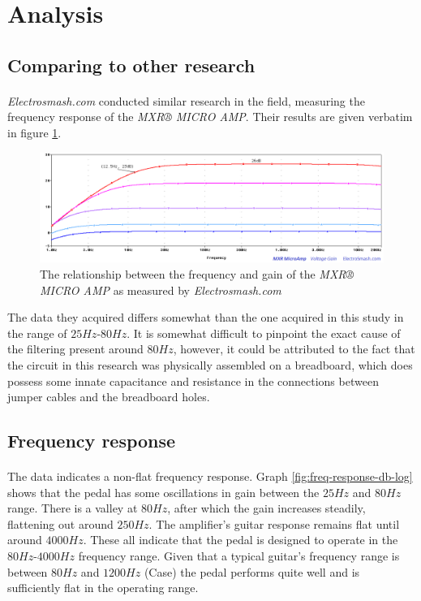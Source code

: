 \documentclass[a4paper, 12pt]{article}
\begin{document}
\section{Analysis}

\subsection{Comparing to other research}
\paragraph*{}
\textit{Electrosmash.com} conducted similar research in the field, measuring 
the frequency response of the \textit{MXR® MICRO AMP}. Their results are given 
verbatim in figure \ref{fig:freq-response-db-log-electrosmash}.
\begin{figure}[ht]
	\centering
	\includegraphics[width=\textwidth]{img/freq-response-db-log-electrosmash}
	\caption{The relationship between the frequency and gain of the 
	\textit{MXR® MICRO AMP} as measured by \textit{Electrosmash.com}}
	\label{fig:freq-response-db-log-electrosmash}
\end{figure}
The data they acquired differs somewhat than the one acquired in this study 
in the range of $25\si{Hz}$-$80\si{Hz}$. It is somewhat difficult to pinpoint 
the exact cause of the filtering present around $80\si{Hz}$, however, it could  
be attributed to the fact that the circuit in this research was physically 
assembled on a breadboard, which does possess some innate capacitance and 
resistance in the connections between jumper cables and the breadboard holes.

\subsection{Frequency response}
\paragraph*{}
The data indicates a non-flat frequency response. Graph 
\ref{fig:freq-response-db-log} shows that the pedal has some oscillations in 
gain between the $25\si{Hz}$ and $80\si{Hz}$ range. There is a valley at 
$80\si{Hz}$, after which the gain increases steadily, flattening out around 
$250\si{Hz}$. The amplifier's guitar response remains flat until around 
$4000\si{Hz}$. These all indicate that the pedal is designed to operate in 
the $80\si{Hz}$-$4000\si{Hz}$ frequency range. Given that a typical guitar's 
frequency range is between $80\si{Hz}$ and $1200\si{Hz}$ (Case) the pedal 
performs quite well and is sufficiently flat in the operating range.
\end{document}
